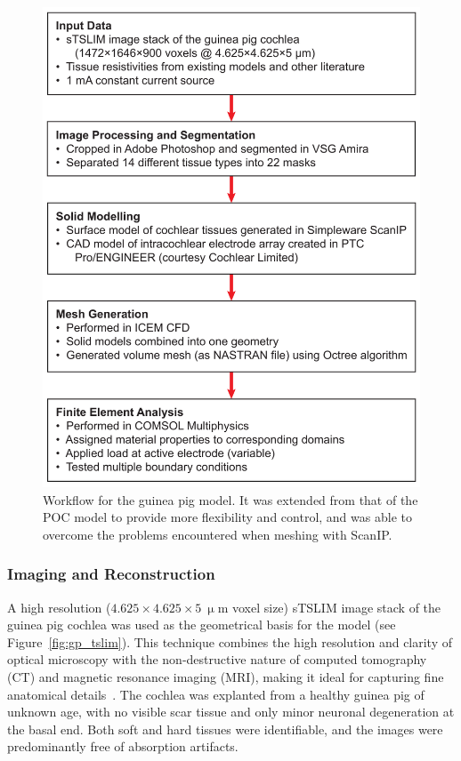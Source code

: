 \begin{figure}
	\centering
	\includegraphics[width=11.8cm]{Methodology/workflow_gp}
	\caption[Workflow for the guinea pig model]{Workflow for the guinea pig
	model. It was extended from that of the POC model to provide more flexibility
	and control, and was able to overcome the problems encountered when meshing
	with ScanIP.}
	\label{fig:workflow_gp}
\end{figure}

\subsubsection{Imaging and Reconstruction}
\label{sect:sTSLIM_imaging}

A high resolution ($ 4.625 \times 4.625 \times 5~\upmu$m voxel size) sTSLIM
image stack of the guinea pig cochlea was used as the geometrical basis for the
model (see Figure~\ref{fig:gp_tslim}). This technique combines the high
resolution and clarity of optical microscopy with the non-destructive nature of
computed tomography (CT) and magnetic resonance imaging (MRI), making it ideal
for capturing fine anatomical details~\cite{santi2011,buytaert2013}. The cochlea
was explanted from a healthy guinea pig of unknown age, with no visible scar
tissue and only minor neuronal degeneration at the basal end. Both soft and hard
tissues were identifiable, and the images were predominantly free of absorption
artifacts.

